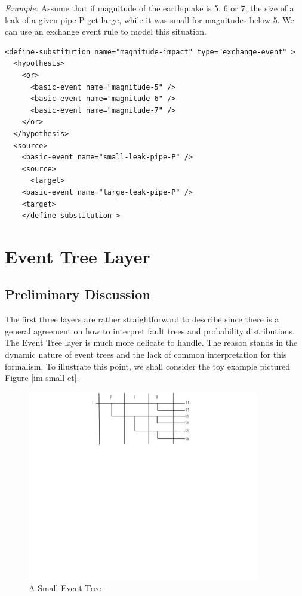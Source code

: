 \documentclass[11pt]{article}
\begin{document}
\emph{Example:} Assume that if magnitude of the earthquake is 5, 6 or 7, the
size of a leak of a given pipe P get large, while it was small for
magnitudes below 5. We can use an exchange event rule to model this
situation.

\lstset{language=XML,label= ,caption= ,captionpos=b,numbers=none}
\begin{lstlisting}
<define-substitution name="magnitude-impact" type="exchange-event" >
  <hypothesis>
    <or>
      <basic-event name="magnitude-5" />
      <basic-event name="magnitude-6" />
      <basic-event name="magnitude-7" />
    </or>
  </hypothesis>
  <source>
    <basic-event name="small-leak-pipe-P" />
    <source>
      <target>
	<basic-event name="large-leak-pipe-P" />
	<target>
	</define-substitution >
\end{lstlisting}

\section{Event Tree Layer}
\label{sec:orgb8a1051}


\subsection{Preliminary Discussion}
\label{sec:org0e50411}

The first three layers are rather straightforward to describe since
there is a general agreement on how to interpret fault trees and
probability distributions. The Event Tree layer is much more delicate to
handle. The reason stands in the dynamic nature of event trees and the
lack of common interpretation for this formalism. To illustrate this
point, we shall consider the toy example pictured Figure \ref{im-small-et}.


\begin{figure}[htbp]

\includegraphics[width=0.9\textwidth]{./word/media/image10.png}
\caption{\label{fig:org33bca25}
A Small Event Tree}
\end{figure}
\end{document}
